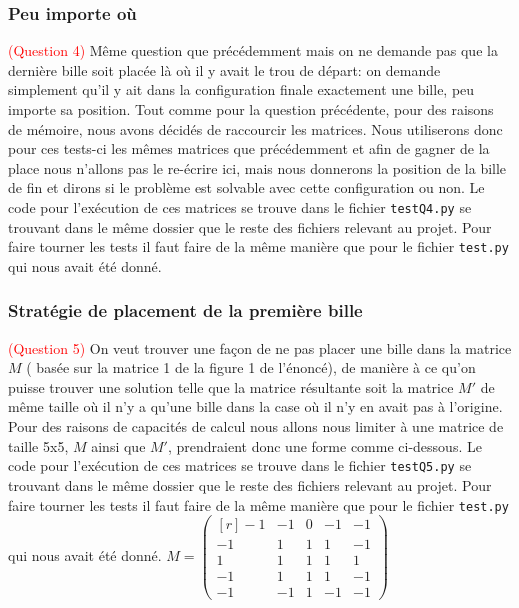 \documentclass[utf8]{article}
\begin{document}
\subsubsection{Peu importe où}
\textcolor{red}{(Question 4)}
Même question que précédemment mais on ne demande pas que la dernière
bille soit placée là où il y avait le trou de départ: on demande simplement
qu’il y ait dans la configuration finale exactement une bille, peu importe
sa position. Tout comme pour la question précédente, pour des raisons de mémoire, nous avons décidés de raccourcir les matrices.
Nous utiliserons donc pour ces tests-ci les mêmes matrices que précédemment et afin de gagner de la place nous n'allons pas le re-écrire ici, mais nous donnerons la position de la bille de fin et dirons si le problème est solvable avec cette configuration ou non. \newline
Le code pour l'exécution de ces matrices se trouve dans le fichier \verb|testQ4.py| se trouvant dans le même dossier que le reste des fichiers relevant au projet. Pour faire tourner les tests il faut faire de la même manière que pour le fichier \verb|test.py| qui nous avait été donné. \newline


\subsubsection{Stratégie de placement de la première bille}
\textcolor{red}{(Question 5)}
On veut trouver une façon de ne pas placer une bille dans  la matrice $M$ ( basée sur la matrice 1 de la figure 1 de l'énoncé), de manière à ce qu'on puisse trouver une solution telle que la matrice résultante soit la matrice $M'$ de même taille où il n'y a qu'une bille dans la case où il n'y en avait pas à l'origine. Pour des raisons de capacités de calcul nous allons nous limiter à une matrice de taille 5x5, $M$ ainsi que $M'$, prendraient donc une forme comme ci-dessous. \newline
Le code pour l'exécution de ces matrices se trouve dans le fichier \verb|testQ5.py| se trouvant dans le même dossier que le reste des fichiers relevant au projet. Pour faire tourner les tests il faut faire de la même manière que pour le fichier \verb|test.py| qui nous avait été donné.
\vspace{1cm} \newline
\vspace{0.5cm}
\hspace{5cm}
$M = \begin{pmatrix*}[r]
-1 & -1 & 0 & -1 & -1\\
-1 &  1 & 1 &  1 & -1\\
 1 &  1 & 1 &  1 &  1\\
-1 &  1 & 1 &  1 & -1\\
-1 & -1 & 1 & -1 & -1
\end{pmatrix*}$
\newline
\end{document}
